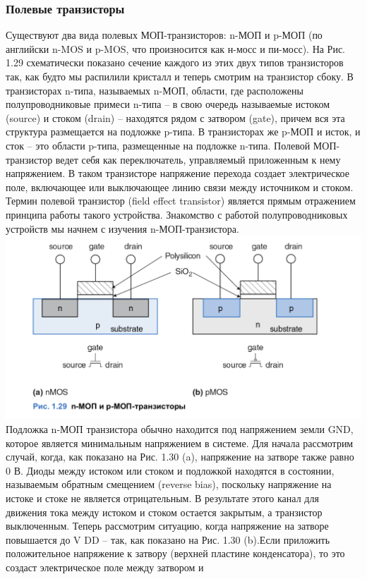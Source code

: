 \documentclass[12pt, a4paper]{article}
\begin{document}
\subsubsection{Полевые транзисторы}
Существуют два вида полевых МОП-транзисторов: n-МОП и p-МОП
(по английски n-MOS и p-MOS, что произносится как н-мосс и пи-мосс).
На Рис. 1.29 схематически показано сечение каждого из этих двух
типов транзисторов так, как будто мы распилили кристалл и теперь смотрим на транзистор сбоку. В транзисторах n-типа, называемых
n-МОП, области, где расположены полупроводниковые примеси
n-типа – в свою очередь называемые истоком (source) и стоком
(drain) – находятся рядом с затвором (gate), причем вся эта структура
размещается на подложке p-типа. В транзисторах же p-МОП и исток,
и сток – это области p-типа, размещенные на подложке n-типа.
Полевой МОП-транзистор ведет себя как переключатель, управляемый
приложенным к нему напряжением. В таком транзисторе напряжение
перехода создает электрическое поле, включающее или выключающее
линию связи между источником и стоком. Термин полевой транзистор
(field effect transistor) является прямым отражением принципа работы
такого устройства. Знакомство с работой полупроводниковых устройств
мы начнем с изучения n-МОП-транзистора.\\
\includegraphics[scale=0.5]{./images/1_29.png}\\
Подложка n-МОП транзистора обычно находится под напряжением
земли GND, которое является минимальным напряжением в системе.
Для начала рассмотрим случай, когда, как показано на Рис. 1.30 (a),
напряжение на затворе также равно 0 В. Диоды между истоком или
стоком и подложкой находятся в состоянии, называемым обратным
смещением (reverse bias), поскольку напряжение на истоке и стоке не
является отрицательным. В результате этого канал для движения тока между истоком и стоком остается закрытым, а транзистор выключенным. Теперь рассмотрим ситуацию, когда напряжение на затворе повышается до V DD – так, как показано на Рис. 1.30 (b).Если приложить положительное напряжение к затвору (верхней пластине конденсатора), то это создаст электрическое поле между затвором и
\end{document}
